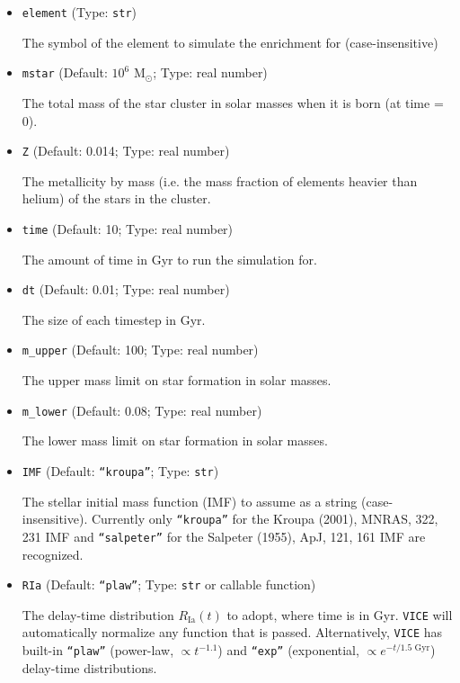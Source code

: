 \documentclass{report}
\begin{document}
\begin{itemize} 
	\item{
		\texttt{element} (Type: \texttt{str}) 
		\par 
		The symbol of the element to simulate the enrichment for 
		(case-insensitive) 
	}

	\item{
		\texttt{mstar} (Default: $10^6$ M$_\odot$; Type: real number) 
		\par
		The total mass of the star cluster in solar masses when it is born 
		(at time = 0). 
	}

	\item{
		\texttt{Z} (Default: 0.014; Type: real number) 
		\par
		The metallicity by mass (i.e. the mass fraction of elements heavier 
		than helium) of the stars in the cluster. 
	}

	\item{
		\texttt{time} (Default: 10; Type: real number) 
		\par
		The amount of time in Gyr to run the simulation for. 
	}

	\item{
		\texttt{dt} (Default: 0.01; Type: real number) 
		\par
		The size of each timestep in Gyr. 
	}

	\item{ 
		\texttt{m\_upper} (Default: 100; Type: real number) 
		\par
		The upper mass limit on star formation in solar masses. 
	}

	\item{
		\texttt{m\_lower} (Default: 0.08; Type: real number) 
		\par
		The lower mass limit on star formation in solar masses. 
	}

	\item{
		\texttt{IMF} (Default: \texttt{``kroupa''}; Type: \texttt{str}) 
		\par
		The stellar initial mass function (IMF) to assume as a string 
		(case-insensitive). Currently only \texttt{``kroupa''} for the Kroupa 
		(2001), MNRAS, 322, 231 IMF and \texttt{``salpeter''} for the Salpeter 
		(1955), ApJ, 121, 161 IMF are recognized. 
	}

	\item{
		\texttt{RIa} (Default: \texttt{``plaw''}; Type: \texttt{str} or 
		callable function)
		\par
		The delay-time distribution $R_\text{Ia}(t)$ to adopt, where time is 
		in Gyr. \texttt{VICE} will automatically normalize any function that 
		is passed. Alternatively, \texttt{VICE} has built-in \texttt{``plaw''} 
		(power-law, $\propto t^{-1.1}$) and \texttt{``exp''} 
		(exponential, $\propto e^{-t /\text{1.5 Gyr}}$) delay-time 
		distributions. 
	}


\end{itemize}
\end{document}
